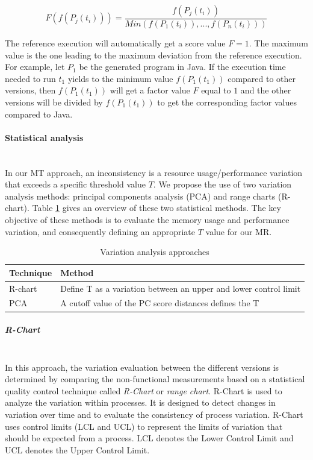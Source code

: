 \begin{equation}
F(f(P_{j}(t_{i})))=\frac{f(P_{j}(t_{i}))}{Min(f(P_{1}(t_{i})),..., f(P_{n}(t_{i})))}  
\end{equation}

The reference execution will automatically get a score value $F = 1$. The maximum value is the one leading to the maximum deviation from the reference execution. For example, let $P_{1}$ be the generated program in Java. If the execution time needed to run $t_{1}$ yields to the minimum value $f(P_{1}(t_{1}))$ compared to other versions, then $f(P_{1}(t_{1}))$ will get a factor value $F$ equal to $1$ and the other versions will be divided by $f(P_{1}(t_{1}))$ to get the corresponding factor values compared to Java.

\paragraph{Statistical analysis}~\\
 
In our MT approach, an inconsistency is a resource usage/performance variation that exceeds a specific threshold value $T$. 
We propose the use of two variation analysis methods\cite{malik2013automatic}: principal components analysis (PCA) and range charts (R-chart). Table \ref{tab:Statistical methods} gives an overview of these two statistical methods.
The key objective of these methods is to evaluate the memory usage and performance variation, and consequently defining an appropriate $T$ value for our MR. 

\begin{table}[h]
	\centering
	
	\begin{tabular}{| l |l |}				
		\hline
		
		\textbf{Technique} &  \textbf{Method}    \\ \hline
	    R-chart &  Define T as a variation between an upper and lower control limit  \\ \hline
		PCA &  A cutoff value of the PC score distances defines the T \\ \hline
	\end{tabular}
	
	\caption{Variation analysis approaches}
	\label{tab:Statistical methods}
\end{table}

\subparagraph{R-Chart}~\\
In this approach, the variation evaluation between the different versions is determined by comparing the non-functional measurements based on a statistical quality control technique called \textit{R-Chart} or \textit{range chart}\cite{malik2013automatic}. 
R-Chart is used to analyze the variation within processes. It is designed to detect changes in variation over time and to evaluate the consistency of process variation.
R-Chart uses control limits (LCL and UCL) to represent the limits of variation that should be expected from a process. LCL denotes the Lower Control Limit and UCL denotes the Upper Control Limit.
 
